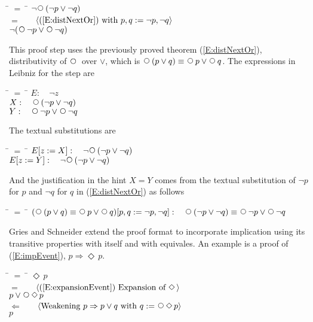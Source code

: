\documentclass[fleqn, leqno]{article}
\newcommand{\lgap}{2pt}                             %
\newcommand{\mymathindent}{24pt}                    %
\newcommand{\impl}{\ensuremath{\Rightarrow}}        %
\newcommand{\Next}{\;\,\text{\raisebox{3.5pt}{\circle{6}}}}
\newcommand{\Event}{\Diamond\,}
\newcommand{\Gll} {\langle}                         %
\newcommand{\Ggg} {\rangle}                         %
\newcommand{\Hint}[1]     {\ \ \ $\Gll              \mbox{#1} \Ggg$ }   %
\begin{document}
\begin{tabbing}
\hspace{\mymathindent} \= $= \;$ \= \kill
  \> \>   $\lnot\Next (\lnot p \lor \lnot q)$\\[\lgap]
  \> $=$  \>  \Hint{(\ref{E:distNextOr}) with $p,q := \lnot p, \lnot q$}\\[\lgap]
  \> \>   $\lnot (\Next\lnot p \lor \Next \lnot q)$
\end{tabbing}

This proof step uses the previously proved theorem (\ref{E:distNextOr}), distributivity of $\Next$ over $\lor$,
which is $\Next (p \lor q) \equiv \Next p \lor \Next q$.
The expressions in Leibniz for the step are

\begin{tabbing}
\hspace{\mymathindent} \= $= \;$ \= \kill
  \> $E:\quad \lnot z$\\[\lgap]
  \> $X:\quad \Next (\lnot p \lor \lnot q)$\\[\lgap]
  \> $Y:\quad \Next \lnot p \lor \Next \lnot q$
\end{tabbing}

The textual substitutions are

\begin{tabbing}
\hspace{\mymathindent} \= $= \;$ \= \kill
  \> $E[z:=X]:\quad \lnot\Next (\lnot p \lor \lnot q)$\\[\lgap]
  \> $E[z:=Y]:\quad \lnot\Next (\lnot p \lor \lnot q)$
\end{tabbing}

And the justification in the hint $X=Y$ comes from the textual substitution of $\lnot p$ for $p$
and $\lnot q$ for $q$ in (\ref{E:distNextOr}) as follows

\begin{tabbing}
\hspace{\mymathindent} \= $= \;$ \= \kill
  \> $(\Next (p \lor q) \equiv \Next p \lor \Next q)[p,q:=\lnot p, \lnot q]:\quad
      \Next (\lnot p \lor \lnot q) \equiv \Next \lnot p \lor \Next \lnot q$
\end{tabbing}

Gries and Schneider \cite{LADM} extend the proof format to incorporate implication using its transitive properties
with itself and with equivales.
An example is a proof of (\ref{E:impEvent}), $p \Rightarrow \Event p$.

\begin{tabbing}
\hspace{\mymathindent} \= $= \;$ \= \kill
  \> \>   $\Event p$\\[\lgap]
  \> $=$  \>  \Hint{(\ref{E:expansionEvent}) Expansion of $\Event$}\\[\lgap]
  \> \>   $p \lor \Next\Event p$\\[\lgap]
  \> $\Leftarrow$  \>  \Hint{Weakening $p\impl p\lor q$ with $q:=\Next\Event p$}\\[\lgap]
  \> \>   $p$
\end{tabbing}
\end{document}
